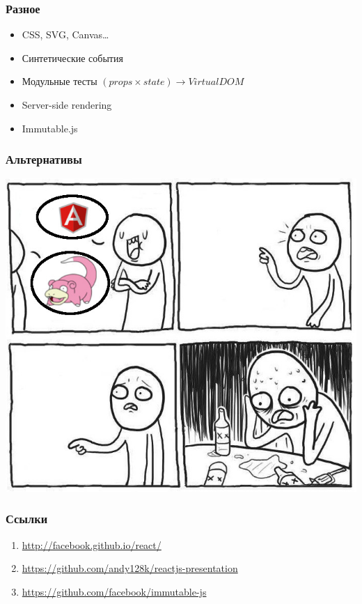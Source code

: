 \documentclass[10pt,utf8]{beamer}
\begin{document}
\begin{frame}[fragile]
  \frametitle{Разное}

  \begin{itemize}
  \item CSS, SVG, Canvas\dots
    \pause
  \item Синтетические события
    \pause
  \item Модульные тесты $(props \times state) \rightarrow Virtual DOM$
    \pause
  \item Server-side rendering
    \pause
  \item Immutable.js
  \end{itemize}
\end{frame}

\begin{frame}[fragile]
  \frametitle{Альтернативы}

  \begin{center}
    \includegraphics[scale=0.3]{alternatives.jpg}
  \end{center}
\end{frame}

\begin{frame}[fragile]
  \frametitle{Ссылки}

  \begin{enumerate}
  \item \href{http://facebook.github.io/react/}{http://facebook.github.io/react/}
  \item \href{https://github.com/andy128k/reactjs-presentation}{https://github.com/andy128k/reactjs-presentation}
  \item \href{https://github.com/facebook/immutable-js}{https://github.com/facebook/immutable-js}
  \end{enumerate}
\end{frame}
\end{document}
